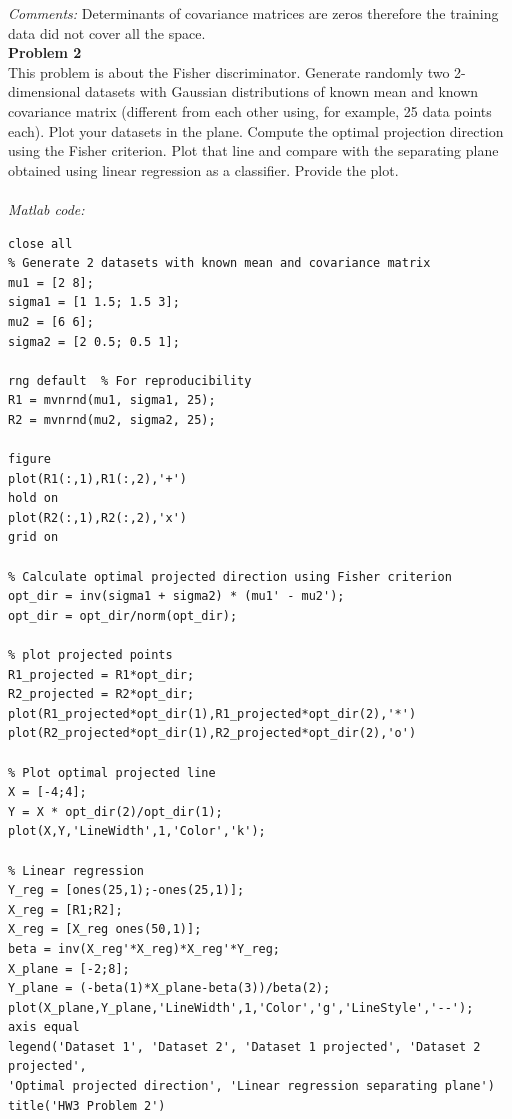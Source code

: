 \documentclass[12pt]{article}
\begin{document}
\textit{Comments:}
Determinants of covariance matrices are zeros therefore the training data did not cover all the space. 
\\\textbf{Problem 2}
\\This problem is about the Fisher discriminator. Generate randomly two 2-dimensional datasets with Gaussian distributions of known mean and known covariance matrix (different from each other using, for example, 25 data points each). Plot your datasets in the plane. Compute the optimal projection direction using the Fisher criterion. Plot that line and compare with the separating plane obtained using linear regression as a classifier. Provide the plot.\\
\\\textit{Matlab code:}
\begin{lstlisting}
close all
% Generate 2 datasets with known mean and covariance matrix
mu1 = [2 8];
sigma1 = [1 1.5; 1.5 3];
mu2 = [6 6];
sigma2 = [2 0.5; 0.5 1];

rng default  % For reproducibility
R1 = mvnrnd(mu1, sigma1, 25);
R2 = mvnrnd(mu2, sigma2, 25);

figure
plot(R1(:,1),R1(:,2),'+')
hold on
plot(R2(:,1),R2(:,2),'x')
grid on

% Calculate optimal projected direction using Fisher criterion
opt_dir = inv(sigma1 + sigma2) * (mu1' - mu2');
opt_dir = opt_dir/norm(opt_dir);

% plot projected points
R1_projected = R1*opt_dir;
R2_projected = R2*opt_dir;
plot(R1_projected*opt_dir(1),R1_projected*opt_dir(2),'*')
plot(R2_projected*opt_dir(1),R2_projected*opt_dir(2),'o')

% Plot optimal projected line
X = [-4;4];
Y = X * opt_dir(2)/opt_dir(1);
plot(X,Y,'LineWidth',1,'Color','k');

% Linear regression
Y_reg = [ones(25,1);-ones(25,1)];
X_reg = [R1;R2];
X_reg = [X_reg ones(50,1)];
beta = inv(X_reg'*X_reg)*X_reg'*Y_reg;
X_plane = [-2;8];
Y_plane = (-beta(1)*X_plane-beta(3))/beta(2);
plot(X_plane,Y_plane,'LineWidth',1,'Color','g','LineStyle','--');
axis equal
legend('Dataset 1', 'Dataset 2', 'Dataset 1 projected', 'Dataset 2 projected', 
'Optimal projected direction', 'Linear regression separating plane')
title('HW3 Problem 2')
\end{lstlisting} 
\end{document}
